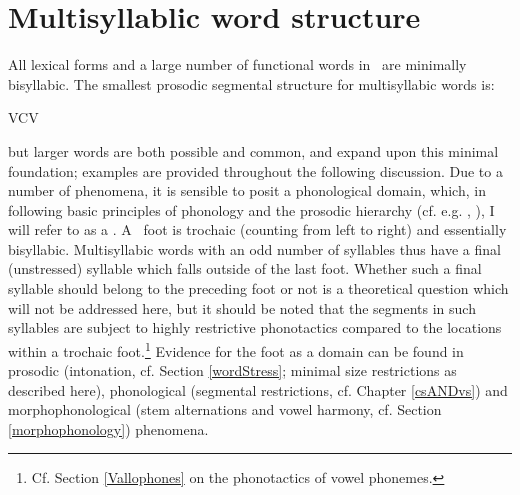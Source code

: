 \section{Multisyllablic word structure}\label{multisyllabicWords}
All lexical forms and a large number of functional words in \PS\ are minimally bisyllabic. The smallest prosodic segmental structure for multisyllabic words is: \begin{center}VCV\end{center} but larger words are both possible and common, and expand upon this minimal foundation; examples are provided throughout the following discussion. Due to a number of phenomena, it is sensible to posit a phonological domain, which, in following basic principles of phonology %
and the prosodic hierarchy %
(cf. e.g. \citet[280-283]{dixon2010a}, \citet{Selkirk1980,Hayes1989,NesporVogel1986}), I will refer to as a . A \PS\ foot is trochaic (counting from left to right) and essentially bisyllabic. Multisyllabic words with an odd number of syllables thus have a final (unstressed) syllable which falls outside of the last foot. 
Whether such a final syllable should belong to the preceding foot or not is a theoretical question which will not be addressed here, but it should be noted that the segments in such syllables are subject to highly restrictive phonotactics compared to the locations within a trochaic foot.\footnote{Cf. Section \ref{Vallophones} on the phonotactics of vowel phonemes.} 
Evidence for the foot as a domain can be found in prosodic (intonation, cf. Section \ref{wordStress}; minimal size restrictions as described here), phonological (segmental restrictions, cf. Chapter \ref{csANDvs}) and morphophonological (stem alternations and vowel harmony, cf. Section \ref{morphophonology}) phenomena. 



